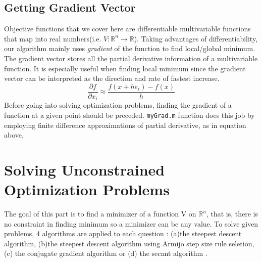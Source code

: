 \documentclass[twoside,11pt]{article}
\begin{document}
\subsection{Getting Gradient Vector}
Objective functions that we cover here are differentiable multivariable functions that map into real numbers(i.e. $V : \mathbb{R}^n \rightarrow \mathbb{R} $).
Taking advantages of differentiability, our algorithm mainly uses \textit{gradient} of the function to find local/global minimum. The gradient vector stores all the partial derivative information of a multivariable function. It is especially useful when finding local minimum since the gradient vector can be interpreted as the direction and rate of fastest increase. 
\begin{equation}
	\frac{\partial f}{\partial x_i} \approx \frac{f(x+h e_i)-f(x)}{h}
\end{equation}
Before going into solving optimization problems, finding the gradient of a function at a given point should be preceded. \texttt{myGrad.m} function does this job by employing finite difference approximations of partial derivative, as in equation above.

\section{Solving Unconstrained Optimization Problems}
The goal of this part is to find a minimizer of a function V on $\mathbb{R}^n$, that is, there is no constraint in finding minimum so a minimizer can be any value. To solve given problems, 4 algorithms are applied to each question : (a)the steepest descent algorithm, (b)the steepest descent algorithm using Armijo step size rule seletion, (c) the conjugate gradient algorithm or (d) the secant algorithm .
\end{document}

